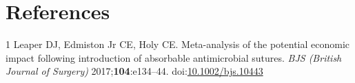 \documentclass[
]{article}
\begin{document}
\hypertarget{references}{%
\section*{References}\label{references}}

\hypertarget{refs}{}
\leavevmode\hypertarget{ref-leaper2017}{}%
1 Leaper DJ, Edmiston Jr CE, Holy CE. Meta-analysis of the potential
economic impact following introduction of absorbable antimicrobial
sutures. \emph{BJS (British Journal of Surgery)}
2017;\textbf{104}:e134--44.
doi:\href{https://doi.org/10.1002/bjs.10443}{10.1002/bjs.10443}
\end{document}
